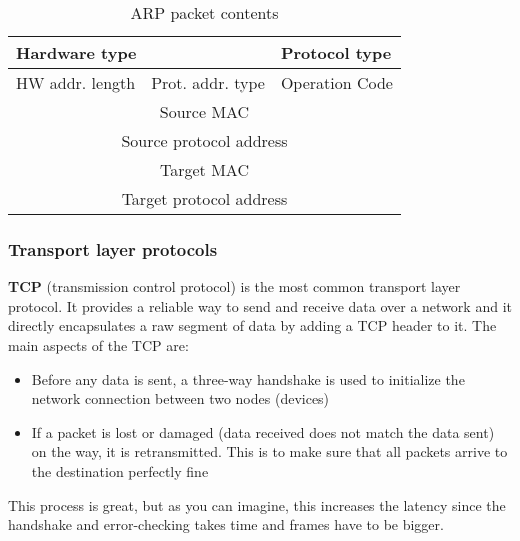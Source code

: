 \documentclass[a4paper]{article}
\begin{document}
  \begin{table}[h]
    \centering
    \begin{tabular}{|p{3cm}|p{3cm}|p{3cm}|p{3cm}|}
      \hline
      \multicolumn{2}{|p{6cm}|}{Hardware type} 
        & \multicolumn{2}{|p{6cm}|}{Protocol type} \\
      \hline
      HW addr. length & Prot. addr. type 
        & \multicolumn{2}{|p{6cm}|}{Operation Code}\\
      \hline
      \multicolumn{4}{|c|}{Source MAC} \\
      \hline
      \multicolumn{4}{|c|}{Source protocol address} \\
      \hline
      \multicolumn{4}{|c|}{Target MAC} \\
      \hline
      \multicolumn{4}{|c|}{Target protocol address} \\
      \hline
    \end{tabular}
    \caption{ARP packet contents}
    \label{arp_packet}
  \end{table}

  \vspace{1cm}


  \subsubsection{Transport layer protocols}

  \textbf{TCP} (transmission control protocol) is the most common transport 
  layer protocol. It provides a reliable way to send and receive data over a 
  network and it directly encapsulates a raw segment of data by adding 
  a TCP header to it. 
  The main aspects of the TCP are:
  \begin{itemize}
    \item Before any data is sent, a three-way handshake is used 
      to initialize the network connection between two nodes (devices)
    \item If a packet is lost or damaged (data received does not match the 
      data sent) on the way, it is retransmitted. This is to make sure
      that all packets arrive to the destination perfectly fine
  \end{itemize}
  This process is great, but as you can imagine, this increases the latency 
  since the handshake and error-checking takes time and frames have to be 
  bigger.
\end{document}

